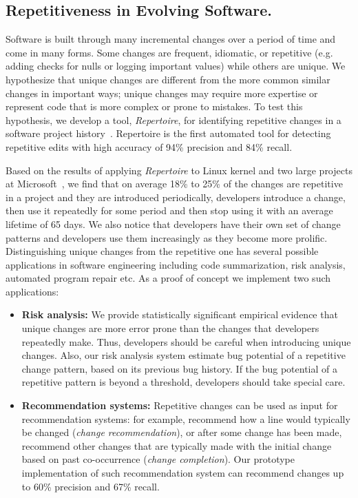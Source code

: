 \documentclass[a4paper, 11pt]{article}
\begin{document}
\begin{small}
\subsection*{\small Repetitiveness in Evolving Software.} Software is built through many incremental changes 
over a period of time and come in many forms. Some changes are frequent, idiomatic, or repetitive (e.g. adding checks for nulls 
or logging important values) while others are unique. We hypothesize that unique changes are different from the more common similar 
changes in important ways;  unique changes may require more expertise or represent code that is more complex or prone to mistakes. 
To test this hypothesis, we  develop a tool, {\em Repertoire}, for identifying repetitive changes in a software project history~\cite{Ray2012:RCP}. 
Repertoire is the first automated tool for detecting repetitive edits with high accuracy of 94\% precision and 84\% recall.

Based on the results of applying {\em Repertoire} to Linux kernel and two large projects at Microsoft~\cite{ray2014unique}, 
we find that on average 18\% to 25\% of the changes are repetitive in a project and they are introduced periodically, \ie developers introduce a change, then use it repeatedly for some period and then stop using it with an average lifetime of 65 days. We also notice that developers have their own set of change patterns and developers use them increasingly as they become more prolific. Distinguishing unique changes from the 
repetitive one has several possible applications in software engineering including code summarization, risk analysis,  automated program repair etc.
As a proof of concept we implement two such applications:

\begin{itemize}
\item \textbf{Risk analysis:} We provide statistically significant empirical evidence that unique changes are 
more error prone than the changes that developers repeatedly make. Thus, developers should be careful when introducing unique changes.
Also, our risk analysis system estimate bug potential of a repetitive change pattern, based on its previous bug history. 
If the bug potential of a repetitive pattern is beyond a threshold, developers should take special care. 

\item \textbf{Recommendation systems:} Repetitive changes can be used as input for 
recommendation systems: for example, recommend how a line would typically be changed 
({\em change recommendation}), or after some change has been made, recommend other changes 
that are typically made with the initial change based on past co-occurrence ({\em change completion}).
Our prototype implementation of such recommendation system can recommend changes up to 60\% precision 
and 67\% recall.


\end{itemize}
\end{small}
\end{document}
